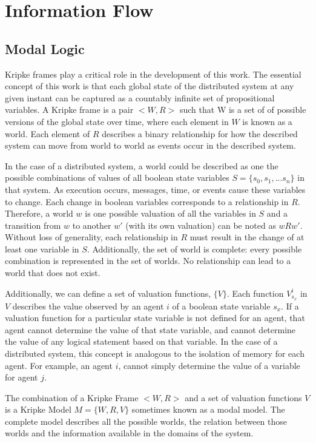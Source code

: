 \section{Information Flow}

\subsection{Modal Logic}

Kripke frames\cite{kripke1959}\cite{blackburn2002modal} play a critical role in the development of this work. The essential concept of this work is that each global state of the distributed system at any given instant can be captured as a countably infinite set of propositional variables. A Kripke frame is a pair $<W,R>$\cite{french2006} such that W is a set of of possible versions of the global state over time, where each element in $W$ is known as a world. Each element of $R$ describes a binary relationship for how the described system can move from world to world as events occur in the described system.

In the case of a distributed system, a world could be described as one the possible combinations of values of all boolean state variables $S=\{s_0, s_1, ... s_n\}$ in that system. As execution occurs, messages, time, or events cause these variables to change. Each change in boolean variables corresponds to a relationship in $R$\cite{Gehrke200565}. Therefore, a world $w$ is one possible valuation of all the variables in $S$ and a transition from $w$ to another $w'$ (with its own valuation) can be noted as $wRw'$. Without loss of generality, each relationship in $R$ must result in the change of at least one variable in $S$. Additionally, the set of world is complete: every possible combination is represented in the set of worlds. No relationship can lead to a world that does not exist.

Additionally, we can define a set of valuation functions, $\{V\}$. Each function $V^i_{s_x}$ in $V$ describes the value observed by an agent $i$ of a boolean state variable $s_x$.  If a valuation function for a particular state variable is not defined for an agent, that agent cannot determine the value of that state variable, and cannot determine the value of any logical statement based on that variable. In the case of a distributed system, this concept is analogous to the isolation of memory for each agent. For example, an agent $i$, cannot simply determine the value of a variable for agent $j$.

The combination of a Kripke Frame $< W,R >$ and a set of valuation functions ${V}$ is a Kripke Model $M = \{W, R, V\}$ sometimes known as a modal model. The complete model describes all the possible worlds, the relation between those worlds and the information available in the domains of the system.

